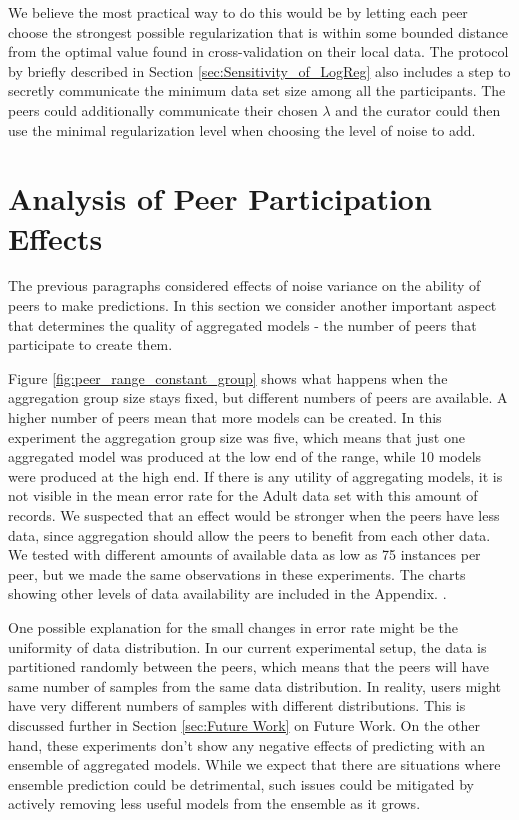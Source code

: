 We believe the most practical way to do this would be by letting each peer choose the strongest possible regularization that is within some bounded distance from the optimal value found in cross-validation on their local data. The protocol by \cite{pathak2010diffprivhomo} briefly described in Section \ref{sec:Sensitivity_of_LogReg} also includes a step to secretly communicate the minimum data set size among all the participants. The peers could additionally communicate their chosen $\lambda$ and the curator could then use the minimal regularization level when choosing the level of noise to add.

\section{Analysis of Peer Participation Effects}
\label{sec:aggregation_effects}

The previous paragraphs considered effects of noise variance on the ability of peers to make predictions. In this section we consider another important aspect that determines the quality of aggregated models - the number of peers that participate to create them. 

Figure \ref{fig:peer_range_constant_group} shows what happens when the aggregation group size stays fixed, but different numbers of peers are available. A higher number of peers mean that more models can be created. In this experiment the aggregation group size was five, which means that just one aggregated model was produced at the low end of the range, while 10 models were produced at the high end. If there is any utility of aggregating models, it is not visible in the mean error rate for the Adult data set with this amount of records. We suspected that an effect would be stronger when the peers have less data, since aggregation should allow the peers to benefit from each other data. We tested with different amounts of available data as low as 75 instances per peer, but we made the same observations in these experiments. The charts showing other levels of data availability are included in the Appendix.  .

One possible explanation for the small changes in error rate might be the uniformity of data distribution. In our current experimental setup, the data is partitioned randomly between the peers, which means that the peers will have same number of samples from the same data distribution. In reality, users might have very different numbers of samples with different distributions. This is discussed further in Section \ref{sec:Future Work} on Future Work. On the other hand, these experiments don't show any negative effects of predicting with an ensemble of aggregated models. While we expect that there are situations where ensemble prediction could be detrimental, such issues could be mitigated by actively removing less useful models from the ensemble as it grows.

